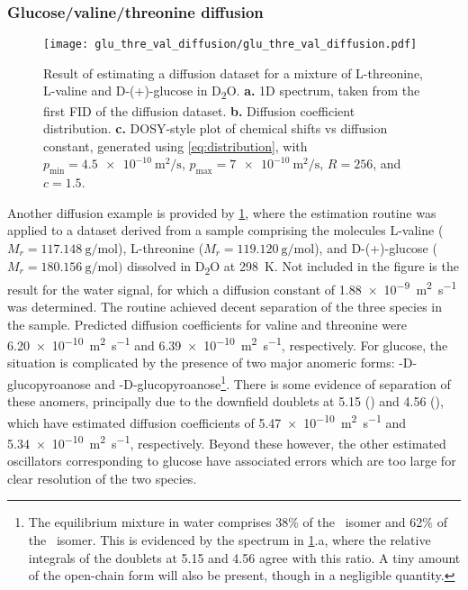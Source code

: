 \subsubsection{Glucose/valine/threonine diffusion}
\begin{figure}
    \centering
    \texttt{[image: glu\_thre\_val\_diffusion/glu\_thre\_val\_diffusion.pdf]}
    \caption[
        Result of estimating a diffusion dataset for a mixture of L-threonine,
        L-valine and D-(+)-glucose.
    ]{
        Result of estimating a diffusion dataset for a mixture of L-threonine,
        L-valine and D-(+)-glucose in D\textsubscript{2}O.
        \textbf{a.} \acs{1D} spectrum, taken from the first \acs{FID} of the
        diffusion dataset.
        \textbf{b.} Diffusion coefficient distribution.
        \textbf{c.} \acs{DOSY}-style plot of chemical shifts vs diffusion
        constant, generated using \cref{eq:distribution}, with
        $p_{\text{min}} = \qty{4.5e-10}{\meter\squared\per\second}$,
        $p_{\text{max}} = \qty{7e-10}{\meter\squared\per\second}$,
        $R=256$, and $c=1.5$.
    }
    \label{fig:gluc_val_thre}
\end{figure}
Another diffusion example is provided by \cref{fig:gluc_val_thre}, where the
estimation routine was applied to a dataset derived from a sample comprising
the molecules L-valine ($M_r = \qty{117.148}{\gram\per\mole}$), L-threonine
($M_r = \qty{119.120}{\gram\per\mole}$), and D-(+)-glucose ($M_r =
\qty{180.156}{\gram\per\mole})$ dissolved in
D\textsubscript{2}O at \qty{298}{\kelvin}. Not included in the figure is the
result for the water signal, for which a diffusion constant of
\qty{1.88e-9}{\meter\squared\per\second} was determined. The routine
achieved decent separation of the three species in the sample. Predicted
diffusion coefficients for valine and threonine were
\qty{6.20e-10}{\meter\squared\per\second} and
\qty{6.39e-10}{\meter\squared\per\second}, respectively. For glucose, the situation is
complicated by the presence of two major anomeric forms:
\textalpha-D-glucopyroanose and
\textbeta-D-glucopyroanose\footnote{
    The equilibrium mixture in water comprises 38\% of the \textalpha\ isomer
    and 62\% of the \textbeta\ isomer.
    This is evidenced by the
    spectrum in \cref{fig:gluc_val_thre}.a, where the relative integrals of
    the doublets at \qty{5.15}{\partspermillion} and
    \qty{4.56}{\partspermillion} agree with this ratio.
    A tiny amount of the open-chain form will
    also be present, though in a negligible quantity.
}\cite[Chapter 3]{Davis2002}.
There is some evidence of separation of these anomers, principally due
to the downfield doublets at \qty{5.15}{\partspermillion} (\textalpha) and
\qty{4.56}{\partspermillion} (\textbeta), which have estimated diffusion
coefficients of \qty{5.47e-10}{\meter\squared\per\second}
and \qty{5.34e-10}{\meter\squared\per\second}, respectively. Beyond these
however, the other estimated oscillators corresponding to glucose have
associated errors which are too large for clear resolution of the two species.

